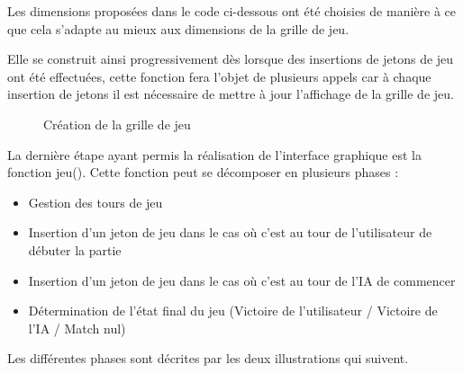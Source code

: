 \documentclass[a4paper]{article}
\begin{document}
Les dimensions proposées dans le code ci-dessous ont été choisies de manière à ce que cela s'adapte au mieux aux dimensions de la grille de jeu.

Elle se construit ainsi progressivement dès lorsque des insertions de jetons de jeu ont été effectuées, cette fonction fera l'objet de plusieurs appels car à chaque insertion de jetons il est nécessaire de mettre à jour l'affichage de la grille de jeu.

\vspace{0.5cm}


\begin{figure}[h!]
      \centering 
      \caption{Création de la grille de jeu}

\end{figure}

\newpage

La dernière étape ayant permis la réalisation de l'interface graphique est la fonction jeu().
Cette fonction peut se décomposer en plusieurs phases :
\vspace{0.3cm}
\begin{itemize}

   \item Gestion des tours de jeu
   \item Insertion d'un jeton de jeu dans le cas où c'est au tour de l'utilisateur de débuter la partie
   \item Insertion d'un jeton de jeu dans le cas où c'est au tour de l'IA de commencer
   \item Détermination de l'état final du jeu (Victoire de l'utilisateur / Victoire de l'IA / Match nul)

\end{itemize}

Les différentes phases sont décrites par les deux illustrations qui suivent.
\end{document}
